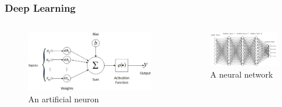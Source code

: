 \documentclass{beamer}
\begin{document}
\begin{frame}
\frametitle{Deep Learning}
\begin{columns}
\begin{figure}[htp]
    \centering
    \includegraphics[scale=0.1]{images/neuron.jpeg}
    \caption{An artificial neuron}
\end{figure}
\begin{figure}[htp]
    \centering
    \includegraphics[scale=0.3]{images/neural_net.png}
    \caption{A neural network}
\end{figure}
\end{columns}
\end{frame}
\end{document}
